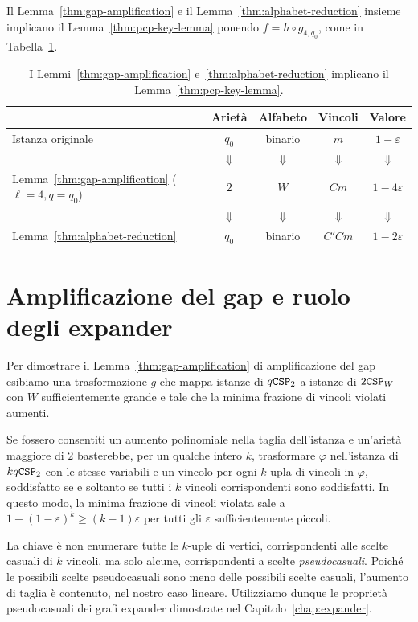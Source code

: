 Il Lemma~\ref{thm:gap-amplification} e il Lemma~\ref{thm:alphabet-reduction}
insieme implicano il Lemma~\ref{thm:pcp-key-lemma} ponendo
$f = h \circ g_{4, q_0}$, come in Tabella~\ref{tab:pcp-composition}.

\begin{table}[htbp]
	\centering
	\begin{tabular}{lcccc}
		\hline
		& Arietà & Alfabeto & Vincoli & Valore \\
		\hline
		Istanza originale & $q_0$ & binario & $m$ & $1 - \varepsilon$ \\
		& $\Downarrow$ & $\Downarrow$ & $\Downarrow$ & $\Downarrow$ \\
		Lemma~\ref{thm:gap-amplification} ($\ell = 4, q = q_0$)
			& $2$ & $W$ & $C m$ & $1 - 4\varepsilon$ \\
		& $\Downarrow$ & $\Downarrow$ & $\Downarrow$ & $\Downarrow$ \\
		Lemma~\ref{thm:alphabet-reduction} & $q_0$ & binario & $C' C m$
			& $1 - 2\varepsilon$ \\
		\hline
	\end{tabular}
	\caption{I Lemmi~\ref{thm:gap-amplification} e~\ref{thm:alphabet-reduction}
		implicano il Lemma~\ref{thm:pcp-key-lemma}.}
	\label{tab:pcp-composition}
\end{table}

\section{Amplificazione del gap e ruolo degli expander}

Per dimostrare il Lemma~\ref{thm:gap-amplification} di amplificazione del gap
esibiamo una trasformazione $g$ che mappa istanze di $q\mathtt{CSP}_2$ a istanze di
$2\mathtt{CSP}_W$ con $W$ sufficientemente grande e tale che la minima frazione di
vincoli violati aumenti.

Se fossero consentiti un aumento polinomiale nella taglia dell'istanza
e un'arietà maggiore di $2$ basterebbe, per un qualche intero $k$, trasformare
$\varphi$ nell'istanza di $kq \mathtt{CSP}_2$ con le stesse variabili e un
vincolo per ogni $k$-upla di vincoli in $\varphi$, soddisfatto se e soltanto se
tutti i $k$ vincoli corrispondenti sono soddisfatti.
In questo modo, la minima frazione di vincoli violata sale a
$1 - (1 - \varepsilon)^k \ge (k - 1)\varepsilon$ per tutti gli $\varepsilon$
sufficientemente piccoli.

La chiave è non enumerare tutte le $k$-uple di vertici, corrispondenti alle
scelte casuali di $k$ vincoli, ma solo alcune, corrispondenti a scelte
\emph{pseudocasuali}. Poiché le possibili scelte pseudocasuali sono meno delle
possibili scelte casuali, l'aumento di taglia è contenuto, nel nostro caso
lineare.
Utilizziamo dunque le proprietà pseudocasuali dei grafi expander dimostrate
nel Capitolo~\ref{chap:expander}.


